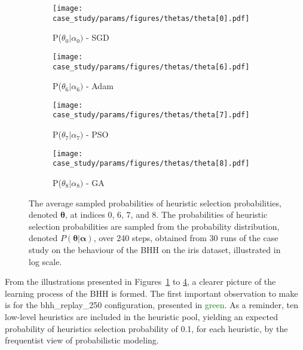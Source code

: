 \begin{figure}[htb]
      \begin{subfigure}{0.5\textwidth}
            \centering
            \texttt{[image: case\_study/params/figures/thetas/theta[0].pdf]}
            \caption{P($\theta_{0} \vert \alpha_{0})$ - \acs{SGD}}
            \label{fig:results:case_study:thetas:0}
      \end{subfigure}
      \begin{subfigure}{0.5\textwidth}
            \centering
            \texttt{[image: case\_study/params/figures/thetas/theta[6].pdf]}
            \caption{P($\theta_{6} \vert \alpha_{6})$ - \acs{Adam}}
            \label{fig:results:case_study:thetas:6}
      \end{subfigure}
      \par\bigskip
      \begin{subfigure}{0.5\textwidth}
            \centering
            \texttt{[image: case\_study/params/figures/thetas/theta[7].pdf]}
            \caption{P($\theta_{7} \vert \alpha_{7})$ - \acs{PSO}}
            \label{fig:results:case_study:thetas:7}
      \end{subfigure}
      \begin{subfigure}{0.5\textwidth}
            \centering
            \texttt{[image: case\_study/params/figures/thetas/theta[8].pdf]}
            \caption{P($\theta_{8} \vert \alpha_{8})$ - \acs{GA}}
            \label{fig:results:case_study:thetas:8}
      \end{subfigure}
      \par\bigskip
      \caption{The average sampled probabilities of heuristic selection probabilities, denoted $\boldsymbol{\theta}$, at indices 0, 6, 7, and 8. The probabilities of heuristic selection probabilities are sampled from the probability distribution, denoted $P(\boldsymbol{\theta} \vert \boldsymbol{\alpha})$, over 240 steps, obtained from 30 runs of the case study on the behaviour of the \acs{BHH} on the iris dataset, illustrated in log scale.}
      \label{fig:results:case_study:thetas}
\end{figure}


From the illustrations presented in Figures~\ref{fig:results:case_study:thetas:0} to \ref{fig:results:case_study:thetas:8}, a clearer picture of the learning process of the \acs{BHH} is formed. The first important observation to make is for the bhh\_replay\_250 configuration, presented in \textcolor{green}{green}. As a reminder, ten low-level heuristics are included in the heuristic pool, yielding an expected probability of heuristics selection probability of 0.1, for each heuristic, by the frequentist view of probabilistic modeling.

